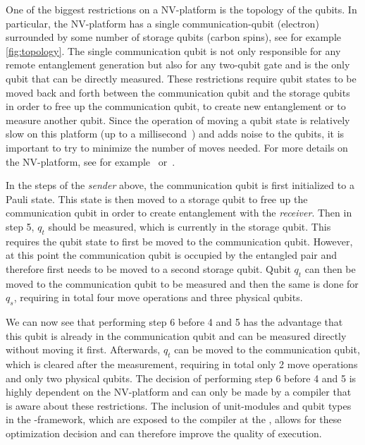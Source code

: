 One of the biggest restrictions on a NV-platform is the topology of the qubits.
In particular, the NV-platform has a single communication-qubit (electron) surrounded by some number of storage qubits (carbon spins), see for example \cref{fig:topology}.
The single communication qubit is not only responsible for any remote entanglement generation but also for any two-qubit gate and is the only qubit that can be directly measured.
These restrictions require qubit states to be moved back and forth between the communication qubit and the storage qubits in order to free up the communication qubit, to create new entanglement or to measure another qubit.
Since the operation of moving a qubit state is relatively slow on this platform (up to a millisecond~\cite{Humphreys2018}) and adds noise to the qubits, it is important to try to minimize the number of moves needed.
For more details on the NV-platform, see for example~\cite{Bernien2014} or~\cite{dahlberg2019linklayer}.

In the steps of the \textit{sender} above, the communication qubit is first initialized to a Pauli state.
This state is then moved to a storage qubit to free up the communication qubit in order to create entanglement with the \textit{receiver}.
Then in step 5, $q_t$ should be measured, which is currently in the storage qubit.
This requires the qubit state to first be moved to the communication qubit.
However, at this point the communication qubit is occupied by the entangled pair and therefore first needs to be moved to a second storage qubit.
Qubit $q_t$ can then be moved to the communication qubit to be measured and then the same is done for $q_s$, requiring in total four move operations and three physical qubits.

We can now see that performing step 6 before 4 and 5 has the advantage that this qubit is already in the communication qubit and can be measured directly without moving it first.
Afterwards, $q_t$ can be moved to the communication qubit, which is cleared after the measurement, requiring in total only 2 move operations and only two physical qubits.
The decision of performing step 6 before 4 and 5 is highly dependent on the NV-platform and can only be made by a compiler that is aware about these restrictions.
The inclusion of unit-modules and qubit types in the \netqasm-framework, which are exposed to the compiler at the \host, allows for these optimization decision and can therefore improve the quality of execution.

